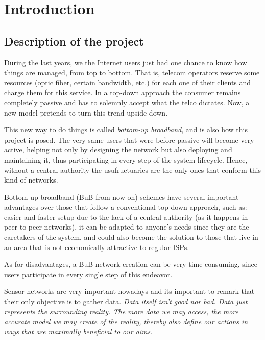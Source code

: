 
\chapter{Introduction} %

\label{Chapter1} %



\section{Description of the project}

During the last years, we the Internet users just had one chance to know how things are managed, from top to bottom. That is, telecom operators reserve some resources (optic fiber, certain bandwidth, etc.) for each one of their clients and charge them for this service. In a top-down approach the consumer remains completely passive and has to solemnly accept what the telco dictates. Now, a new model pretends to turn this trend upside down.

This new way to do things is called \emph{bottom-up broadband}, and is also how this project is posed. The very same users that were before passive will become very active, helping not only by designing the network but also deploying and maintaining it, thus participating in every step of the system lifecycle. Hence, without a central authority the usufructuaries are the only ones that conform this kind of networks.

Bottom-up broadband (BuB from now on) schemes have several important advantages over those that follow a conventional top-down approach, such as: easier and faster setup due to the lack of a central authority (as it happens in peer-to-peer networks), it can be adapted to anyone's needs since they are the caretakers of the system, and could also become the solution to those that live in an area that is not economically attractive to regular ISPs\citep{}. %

As for disadvantages, a BuB network creation can be very time consuming, since users participate in every single step of this endeavor\citep{}. %

Sensor networks are very important nowadays and its important to remark that their only objective is to gather data. \emph{Data itself isn't good nor bad. Data just represents the surrounding reality. The more data we may access, the more accurate model we may create of the reality, thereby also define our actions in ways that are maximally beneficial to our aims}\citep{}. %

